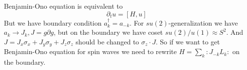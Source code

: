\documentclass[12pt]{article}
\begin{document}
Benjamin-Ono equation is equivalent to
\begin{equation}
  \label{eq:43}
  \partial_{t}u=[H,u]
\end{equation}
But we have boundary condition $a^{\dagger}_{k}=a_{-k}$. For $su(2)$-generalization we have
$a_{k}\to J_{k}, J=g \partial g$, but on the boundary we have coset $su(2)/u(1)\approx S^{2}$. And
$J=J_{x}\sigma_{x}+J_{y}\sigma_{y}+J_{z}\sigma_{z}$ should be changed to $\sigma_{z}\cdot J$. So if
we want to get Benjamin-Ono equation for spin waves we need to rewrite $H=\sum_{k}:J_{-k} L_{k}:$ on
the boundary.  
\end{document}
